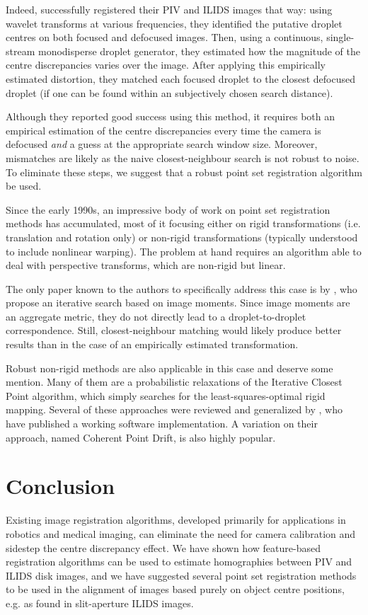\documentclass[floatfix,aip,rsi,reprint,graphicx]{revtex4-1}
\begin{document}
Indeed, \citet{Hardalupas10} successfully registered their PIV and ILIDS
images that way: using wavelet transforms at various frequencies, they
identified the putative droplet centres on both focused and defocused images.
Then, using a continuous, single-stream monodisperse droplet generator, they
estimated how the magnitude of the centre discrepancies varies over the image.
After applying this empirically estimated distortion, they matched each focused
droplet to the closest defocused droplet (if one can be found within an
subjectively chosen search distance).

Although they reported good success using this method, it requires both an
empirical estimation of the centre discrepancies every time the camera is
defocused \emph{and} a guess at the appropriate search window size. Moreover,
mismatches are likely as the naive closest-neighbour search is not robust to
noise. To eliminate these steps, we suggest that a robust point set
registration algorithm be used.

Since the early 1990s, an impressive body of work on point set registration
methods has accumulated, most of it focusing either on rigid transformations
(i.e. translation and rotation only) or non-rigid transformations (typically
understood to include nonlinear warping). The problem at hand requires an
algorithm able to deal with perspective transforms, which are non-rigid but
linear.

The only paper known to the authors to specifically address this case is by
\citet{Chi11}, who propose an iterative search based on image moments. Since
image moments are an aggregate metric, they do not directly lead to a
droplet-to-droplet correspondence. Still, closest-neighbour matching would
likely produce better results than in the case of an empirically estimated
transformation.

Robust non-rigid methods are also applicable in this case and deserve some
mention. Many of them are a probabilistic relaxations of the Iterative Closest
Point algorithm, which simply searches for the least-squares-optimal rigid
mapping. Several of these approaches were reviewed and generalized by
\citet{Jian10}, who have published a working software implementation. A
variation on their approach, named Coherent Point Drift, is also highly
popular.\cite{Myronenko10}

\section{Conclusion}
Existing image registration algorithms, developed primarily for applications in
robotics and medical imaging, can eliminate the need for camera calibration and 
sidestep the centre discrepancy effect. We have shown how feature-based
registration algorithms can be used to estimate homographies between PIV and
ILIDS disk images, and we have suggested several point set registration methods
to be used in the alignment of images based purely on object centre positions,
e.g. as found in slit-aperture ILIDS images.




\end{document}
